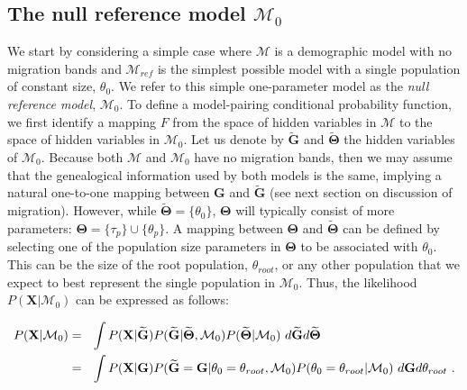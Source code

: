 \documentclass[11pt]{article}
\newcommand{\vect}[1]{\boldsymbol{\mathbf{#1}}}
\newcommand{\X}{\vect{X}}
\newcommand{\M}{\mathcal{M}}
\newcommand{\G}{\vect{G}}
\newcommand{\T}{\vect{\Theta}}
\newcommand{\GT}{\G\T}
\newcommand{\Mref}{\M_{ref}}
\newcommand{\Gref}{\widetilde{\G}}
\newcommand{\Tref}{\widetilde{\T}}
\newcommand{\troot}{\theta_{root}}
\begin{document}
\subsection*{The null reference model $\M_0$}

We start by considering a simple case where $\M$ is a demographic model with no migration bands and $\Mref$
is the simplest possible model with a single population of constant size, $\theta_0$.
%
We refer to this simple one-parameter model as the {\em null reference model}, $\M_0$.
%
To define a model-pairing conditional probability function, we first identify a mapping $F$ from the space
of hidden variables in $\M$ to the space of hidden variables in $\M_0$.
%
Let us denote by $\Gref$ and $\Tref$ the hidden variables of $\M_0$.
%
Because both $\M$ and $\M_0$ have no migration bands, then we may assume that the genealogical information used
by both models is the same, implying a natural one-to-one mapping between $\G$ and $\Gref$ (see next section on discussion of migration).
%
However, while $\Tref=\{\theta_0\}$, $\T$ will typically consist of more parameters: $\T=\{\tau_p\}\cup\{\theta_p\}$.
%
A mapping between $\T$ and $\Tref$ can be defined by selecting one of the population size parameters in $\T$
to be associated with $\theta_0$. This can be the size of the root population, $\troot$, or any other population
that we expect to best represent the single population in $\M_0$. 
%
Thus, %
%
the likelihood $P(\X|\M_0)$ can be expressed as follows:
%
%
\begin{small}
\begin{align}
P(\X|\M_0)
&=~~ \int P(\X|\Gref) P(\Gref|\Tref,\M_0) P(\Tref|\M_0)\ d\Gref d\Tref  \notag \\ %
&=~~ \int P(\X|\G) P(\Gref=\G|\theta_0=\troot,\M_0) P(\theta_0=\troot|\M_0)\ d\G d\troot  ~. \notag
\end{align}
\end{small}
\end{document}
